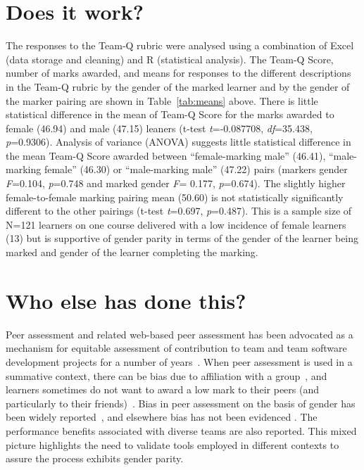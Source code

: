 \documentclass[sigconf, anonymous=false]{acmart}
\begin{document}
\section{Does it work?}	
The responses to the Team-Q rubric were analysed using a combination
of Excel (data storage and cleaning) and R (statistical analysis). The
Team-Q Score, number of marks awarded, and means for responses to the
different descriptions in the Team-Q rubric by the gender of the
marked learner and by the gender of the marker pairing are shown in
Table~\ref{tab:means} above. There is little statistical difference in
the mean of Team-Q Score for the marks awarded to female (46.94) and
male (47.15) leaners (t-test {\emph{t}}=-0.087708, {\emph{df}}=35.438,
{\emph{p}}=0.9306). Analysis of variance (ANOVA) suggests little
statistical difference in the mean Team-Q Score awarded between
``female-marking male'' (46.41), ``male-marking female'' (46.30) or
``male-marking male'' (47.22) pairs (markers gender {\emph{F}}=0.104,
{\emph{p}}=0.748 and marked gender {\emph{F}}= 0.177,
{\emph{p}}=0.674). The slightly higher female-to-female marking
pairing mean (50.60) is not statistically significantly different to
the other pairings (t-test {\emph{t}}=0.697, {\emph{p}}=0.487).  This
is a sample size of N=121 learners on one course delivered with a low
incidence of female learners (13) but is supportive of gender parity
in terms of the gender of the learner being marked and gender of the
learner completing the marking.

\section{Who else has done this?}
Peer assessment and related web-based peer assessment has been
advocated as a mechanism for equitable assessment of contribution to
team and team software development projects for a number of
years~\cite{Lejk2001,Clark2005,Raban_Litchfield_2007,
Gordon2010,Fagerholm, Britton2017,Philips21}. When peer assessment is
used in a summative context, there can be bias due to affiliation with
a group~\cite{Cestone2008}, and learners sometimes do not want to
award a low mark to their peers (and particularly to their
friends)~\cite{Sridharam2003}. Bias in peer assessment on the basis of
gender has been widely reported~\cite{Heels2019,Stonewall2018}, and
elsewhere bias has not been evidenced
\cite{Tucker2014,Falchikov1997}. The performance benefits associated with
diverse teams are also reported. This mixed picture
highlights the need to validate tools employed in different contexts
to assure the process exhibits gender parity.
\end{document}
